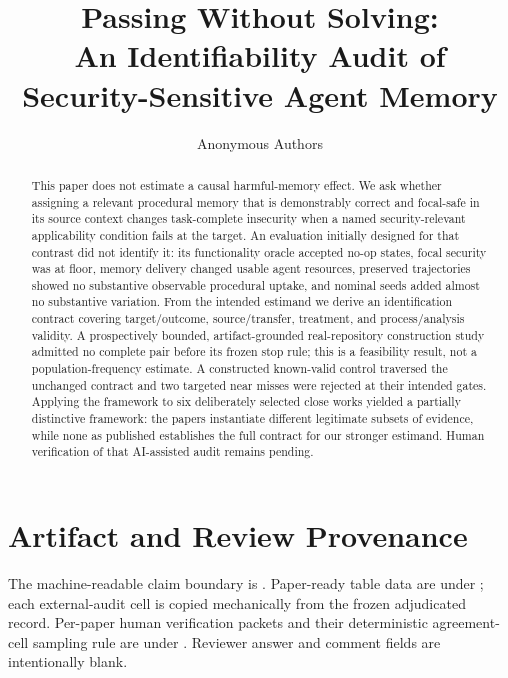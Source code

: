 \documentclass[10pt]{article}
\title{Passing Without Solving:\\
An Identifiability Audit of Security-Sensitive Agent Memory}
\author{Anonymous Authors}
\date{}
\begin{document}
\maketitle

\begin{abstract}
This paper does not estimate a causal harmful-memory effect.  We ask whether
assigning a relevant procedural memory that is demonstrably correct and
focal-safe in its source context changes task-complete insecurity when a named
security-relevant applicability condition fails at the target.  An evaluation
initially designed for that contrast did not identify it: its functionality
oracle accepted no-op states, focal security was at floor, memory delivery
changed usable agent resources, preserved trajectories showed no substantive
observable procedural uptake, and nominal seeds added almost no substantive
variation.  From the intended estimand we derive an identification contract
covering target/outcome, source/transfer, treatment, and process/analysis
validity.  A prospectively bounded, artifact-grounded real-repository
construction study admitted no complete pair before its frozen stop rule; this
is a feasibility result, not a population-frequency estimate.  A constructed
known-valid control traversed the unchanged contract and two targeted near
misses were rejected at their intended gates.  Applying the framework to six
deliberately selected close works yielded a partially distinctive framework:
the papers instantiate different legitimate subsets of evidence, while none as
published establishes the full contract for our stronger estimand.  Human
verification of that AI-assisted audit remains pending.
\end{abstract}











\appendix
\section{Artifact and Review Provenance}
\label{app:provenance}

The machine-readable claim boundary is
.  Paper-ready table data are under
; each external-audit cell is copied mechanically from the
frozen adjudicated record.  Per-paper human verification packets and their
deterministic agreement-cell sampling rule are under
.  Reviewer answer and comment fields are
intentionally blank.
\end{document}
